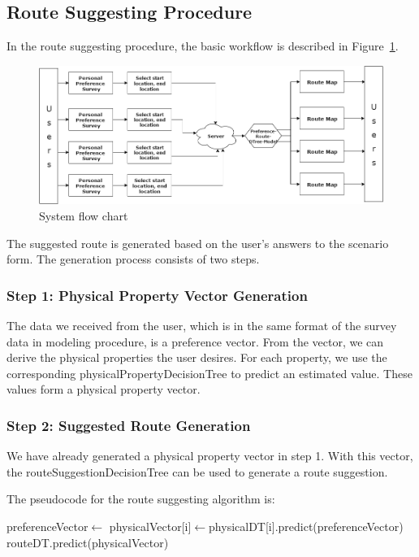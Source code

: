 \documentclass{sigchi}
\begin{document}
\subsection{Route Suggesting Procedure}
In the route suggesting procedure, the basic workflow is described in Figure~\ref{fig:route-suggest-work-flow}.

\begin{figure}[!h]
\centering
\includegraphics[width=1.0\columnwidth]{pics/route-suggest-work-flow.png}
\caption{System flow chart}
\label{fig:route-suggest-work-flow}
\end{figure}

The suggested route is generated based on the user’s answers to the scenario form. The generation process consists of two steps.

\subsubsection{Step 1: Physical Property Vector Generation}
The data we received from the user, which is in the same format of the survey data in modeling procedure,  is a preference vector. From the vector, we can derive the physical properties the user desires. For each property, we use the corresponding physicalPropertyDecisionTree to predict an estimated value. These values form a physical property vector.

\subsubsection{Step 2: Suggested Route Generation}
We have already generated a physical property vector in step 1. With this vector, the routeSuggestionDecisionTree can be used to generate a route suggestion.

The pseudocode for the route suggesting algorithm is:
\begin{algorithmic}\footnotesize
    \State preferenceVector$\gets$
      \State physicalVector[i]$\gets$physicalDT[i].predict(preferenceVector) \EndFor
    \State \Return routeDT.predict(physicalVector)
  \EndFunction
\end{algorithmic}
\end{document}

